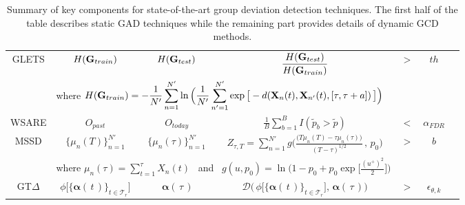 \begin{table}[H]
{\begin{tabular}{ccccccc }
  \\[2mm]
 GLETS 
&   $H({\bf G}_{train}) $ &  $ H({\bf G}_{test}) $  & $ \displaystyle \frac{ H({\bf G}_{test})}{H({\bf G}_{train}) }   $ 
& $>$ & $th$ %
\\[3mm]
&  \multicolumn{3}{l}{ 
 where $  H({\bf G}_{train}) = \displaystyle -\frac{1}{N'}\sum_{n=1}^{N'} \ln \Big(  \frac{1}{{N'}}\sum_{n'=1}^{N'}  \exp\big[-d({\bf X}_{n}(t),{\bf X}_{n'}(t),[\tau,\tau+a] )\,\big ] \Big)  $} &  \\[6mm]
 WSARE & $O_{past}$  & $O_{today}$ & $\displaystyle  \frac{1}{B} \sum_{b=1}^ B I ( \tilde{p}_b > \tilde{p} )  $ &$<$ & $\alpha_{FDR}$   \\[4mm]
 MSSD  & $\{ \mu_n(T) \}_{n=1}^{N'} $  & $\{ \mu_n(\tau) \}_{n=1}^{N'}  $  
 & $ \displaystyle Z_{\tau,T}=\sum_{n=1}^{N'} g\Big( \frac{  
\big( T \mu_n(T) - \tau \mu_n(\tau) \big) }{(T-\tau)^{1/2} }
 \, , \, p_0  \Big) $ %
& $>$ & $b$%
 \\[2mm]
&  \multicolumn{3}{l}{
  where $ \displaystyle \mu_n(\tau) = \sum_{t=1}^\tau    X_{n}(t) $ \, and \, $ g(u,p_0)= \displaystyle\ln \Big(1-p_0+p_0 \exp\Big[\frac{(u^+)^2}{2}\Big]\Big)$ } 
& \\[5mm]
GT$\Delta$ & $\phi \big[\{ { \boldsymbol \alpha} { (\, t\, ) } \}_{t \in \mathcal{T}_{r}}   \big] $ & $ \, {\boldsymbol \alpha}( \, \tau \, )$ & $   \mathcal{D}\Big(\,   \phi \big[\{ { \boldsymbol \alpha} { (\, t\, ) } \}_{t \in \mathcal{T}_{r}}   \big], \, {\boldsymbol \alpha}( \, \tau \, )   \Big)  $
&$>$&$\epsilon_{\theta,k}$ 
\\[2mm]
\hline
 \end{tabular}
 }
\smallskip
\caption{Summary of key components for state-of-the-art group deviation detection techniques. The first half of the table describes static GAD techniques while the remaining part provides  details of dynamic GCD methods.  }
 \label{Tab:GADtechniques}
\end{table} 





  


